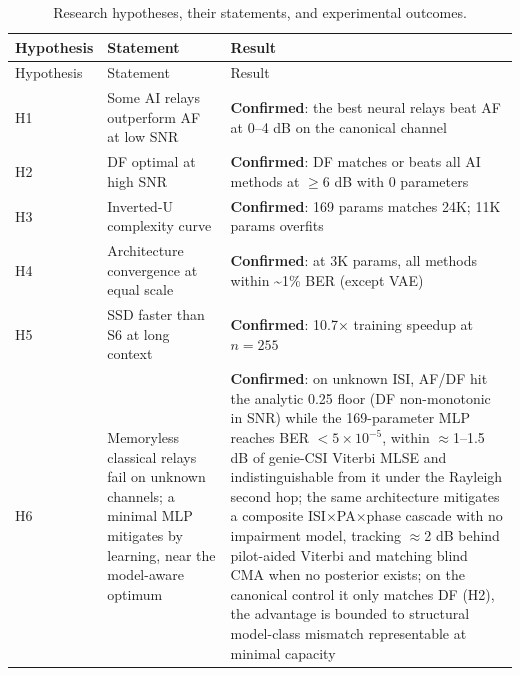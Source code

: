 \begin{longtable}[]{@{}
  >{\raggedright\arraybackslash}p{}
  >{\raggedright\arraybackslash}p{}
  >{\raggedright\arraybackslash}p{}@{}}
\caption{Research hypotheses, their statements, and experimental outcomes.}\label{tbl:table33}\tabularnewline
\toprule\noalign{}
\begin{minipage}[b]{\linewidth}\raggedright
Hypothesis
\end{minipage} & \begin{minipage}[b]{\linewidth}\raggedright
Statement
\end{minipage} & \begin{minipage}[b]{\linewidth}\raggedright
Result
\end{minipage} \\
\midrule\noalign{}
\endfirsthead
\toprule\noalign{}
\begin{minipage}[b]{\linewidth}\raggedright
Hypothesis
\end{minipage} & \begin{minipage}[b]{\linewidth}\raggedright
Statement
\end{minipage} & \begin{minipage}[b]{\linewidth}\raggedright
Result
\end{minipage} \\
\midrule\noalign{}
\endhead
\bottomrule\noalign{}
\endlastfoot
H1 & Some AI relays outperform AF at low SNR & \textbf{Confirmed}: the best neural relays beat AF at 0--4 dB on the canonical channel \\
H2 & DF optimal at high SNR & \textbf{Confirmed}: DF matches or beats all AI methods at \(\geq 6\) dB with 0 parameters \\
H3 & Inverted-U complexity curve & \textbf{Confirmed}: 169 params matches 24K; 11K params overfits \\
H4 & Architecture convergence at equal scale & \textbf{Confirmed}: at 3K params, all methods within \textasciitilde1\% BER (except VAE) \\
H5 & SSD faster than S6 at long context & \textbf{Confirmed}: 10.7× training speedup at \(n = 255\) \\
H6 & Memoryless classical relays fail on unknown channels; a minimal MLP mitigates by learning, near the model-aware optimum & \textbf{Confirmed}: on unknown ISI, AF/DF hit the analytic 0.25 floor (DF non-monotonic in SNR) while the 169-parameter MLP reaches BER $<5\times10^{-5}$, within $\approx$1--1.5 dB of genie-CSI Viterbi MLSE and indistinguishable from it under the Rayleigh second hop; the same architecture mitigates a composite ISI$\times$PA$\times$phase cascade with no impairment model, tracking $\approx$2 dB behind pilot-aided Viterbi and matching blind CMA when no posterior exists; on the canonical control it only matches DF (H2), the advantage is bounded to structural model-class mismatch representable at minimal capacity \\
\end{longtable}

